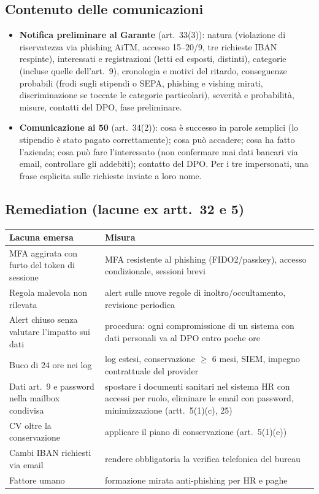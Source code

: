 \subsection{Contenuto delle comunicazioni}
\begin{itemize}
  \item \textbf{Notifica preliminare al Garante} (art.~33(3)): natura (violazione di riservatezza via
    phishing AiTM, accesso 15--20/9, tre richieste IBAN respinte), interessati e registrazioni (letti
    ed esposti, distinti), categorie (incluse quelle dell'art.~9), cronologia e motivi del ritardo,
    conseguenze probabili (frodi sugli stipendi o SEPA, phishing e vishing mirati, discriminazione
    se toccate le categorie particolari), severità e probabilità, misure, contatti del DPO, fase
    preliminare.
  \item \textbf{Comunicazione ai 50} (art.~34(2)): cosa è successo in parole semplici (lo stipendio è
    stato pagato correttamente); cosa può accadere; cosa ha fatto l'azienda; cosa può fare
    l'interessato (non confermare mai dati bancari via email, controllare gli addebiti); contatto del
    DPO. Per i tre impersonati, una frase esplicita sulle richieste inviate a loro nome.
\end{itemize}

\subsection{Remediation (lacune ex artt.~32 e 5)}
\begin{center}
\small
\begin{tabularx}{\linewidth}{X X}
\toprule
\textbf{Lacuna emersa} & \textbf{Misura} \\ \midrule
MFA aggirata con furto del token di sessione & MFA resistente al phishing (FIDO2/passkey), accesso
  condizionale, sessioni brevi \\
Regola malevola non rilevata & alert sulle nuove regole di inoltro/occultamento, revisione periodica \\
Alert chiuso senza valutare l'impatto sui dati & procedura: ogni compromissione di un sistema con
  dati personali va al DPO entro poche ore \\
Buco di 24 ore nei log & log estesi, conservazione $\ge$ 6 mesi, SIEM, impegno contrattuale del
  provider \\
Dati art.~9 e password nella mailbox condivisa & spostare i documenti sanitari nel sistema HR con
  accessi per ruolo, eliminare le email con password, minimizzazione (artt.~5(1)(c), 25) \\
CV oltre la conservazione & applicare il piano di conservazione (art.~5(1)(e)) \\
Cambi IBAN richiesti via email & rendere obbligatoria la verifica telefonica del bureau \\
Fattore umano & formazione mirata anti-phishing per HR e paghe \\
\bottomrule
\end{tabularx}
\end{center}

